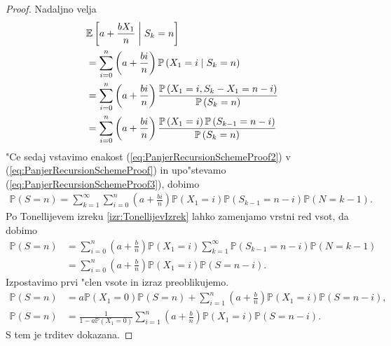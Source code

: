 \documentclass[12pt, a4paper, reqno]{amsart}
\theoremstyle{definition}
\theoremstyle{plain}
\newcommand{\E}{\mathbb{E}}
\newcommand{\Prob}{\mathbb{P}}
\newcommand{\1}{\mathds{1}}
\newcommand*{\refPriloga}[1]{%
  \begingroup
    \hypersetup{
      linkcolor=properpurple,
      linkbordercolor=properpurple,
    }%
    \ref{#1}%
  \endgroup
}
\begin{document}
\begin{proof}
        Nadaljno velja  
        \begin{align}   
            & \E\left[a + \frac{bX_1}{n} \biggm|   S_k = n\right] \nonumber \\
            &= \sum_{i = 0}^n\left(a + \frac{bi}{n}\right)\Prob\left(X_1 = i\mid S_k = n\right) \nonumber \\
            &= \sum_{i = 0}^n\left(a + \frac{bi}{n}\right)\frac{\Prob\left(X_1 = i, S_k - X_1 = n - i\right)}{\Prob\left(S_k = n\right)} \nonumber \\
            &= \sum_{i = 0}^n\left(a + \frac{bi}{n}\right)\frac{\Prob\left(X_1 = i\right)\Prob\left(S_{k- 1} = n - i\right)}{\Prob\left(S_k = n\right)} \label{eq:PanjerRecursionSchemeProof3} 
        \end{align}
        "Ce sedaj vstavimo enakost (\ref{eq:PanjerRecursionSchemeProof2}) v (\ref{eq:PanjerRecursionSchemeProof}) 
        in upo"stevamo (\ref{eq:PanjerRecursionSchemeProof3}), dobimo
        \begin{align*}
            \Prob\left(S = n\right) 
                = \sum_{k = 1}^\infty\sum_{i = 0}^n \left(a + \frac{bi}{n}\right)\Prob\left(X_1 = i\right)\Prob\left(S_{k - 1} = n - i\right)\Prob\left(N = k - 1\right).
        \end{align*}
        Po Tonellijevem izreku \refPriloga{izr:TonellijevIzrek} lahko zamenjamo vrstni red vsot, da dobimo
        \begin{align*}
            \Prob\left(S = n\right) 
                &= \sum_{i = 0}^n\left(a + \frac{b}{n}\right)\Prob\left(X_1 = i\right)\sum_{k = 1}^\infty\Prob\left(S_{k - 1} = n - i\right)\Prob\left(N = k - 1\right)\\
                &= \sum_{i = 0}^n\left(a + \frac{b}{n}\right)\Prob\left(X_1 = i\right)\Prob\left(S = n - i\right).
        \end{align*}
        Izpostavimo prvi "clen vsote in izraz preoblikujemo.
        \begin{align*}
            \Prob\left(S = n\right) 
                &= a\Prob\left(X_1 = 0\right)\Prob\left(S = n\right) + \sum_{i = 1}^n\left(a + \frac{b}{n}\right)\Prob\left(X_1 = i\right)\Prob\left(S = n - i\right), \\
            \Prob\left(S = n\right)
                &= \frac{1}{1 - a\Prob\left(X_1 = 0\right)}\sum_{i = 1}^n\left(a + \frac{b}{n}\right)\Prob\left(X_1 = i\right)\Prob\left(S = n - i\right).
        \end{align*}
        S tem je trditev dokazana.
    \end{proof}
\end{document}
